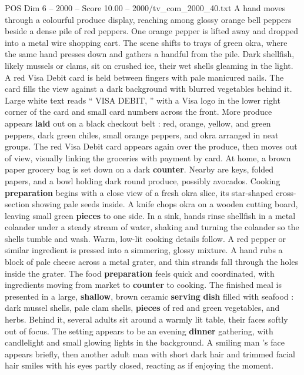 \begin{textsample}{POS Dim 6 – 2000 – Score 10.00 – 2000/tv\_com\_2000\_40.txt}  \label{ex:f6_pos_052}
A hand moves through a colourful produce display, reaching among glossy orange bell peppers beside a dense pile of red peppers.
One orange pepper is lifted away and dropped into a metal wire shopping cart.
The scene shifts to trays of green okra, where the same hand presses down and gathers a handful from the pile.
Dark shellfish, likely mussels or clams, sit on crushed ice, their wet shells gleaming in the light.
A red Visa Debit card is held between fingers with pale manicured nails.
The card fills the view against a dark background with blurred vegetables behind it.
Large white text reads “ VISA DEBIT, ” with a Visa logo in the lower right corner of the card and small card numbers across the front.
More produce appears \textbf{laid} out on a black checkout belt : red, orange, yellow, and green peppers, dark green chiles, small orange peppers, and okra arranged in neat groups.
The red Visa Debit card appears again over the produce, then moves out of view, visually linking the groceries with payment by card.
At home, a brown paper grocery bag is set down on a dark \textbf{counter}.
Nearby are keys, folded papers, and a bowl holding dark round produce, possibly avocados.
Cooking \textbf{preparation} begins with a close view of a fresh okra slice, its star-shaped cross-section showing pale seeds inside.
A knife chops okra on a wooden cutting board, leaving small green \textbf{pieces} to one side.
In a sink, hands rinse shellfish in a metal colander under a steady stream of water, shaking and turning the colander so the shells tumble and wash.
Warm, low-lit cooking details follow.
A red pepper or similar ingredient is pressed into a simmering, glossy mixture.
A hand rubs a block of pale cheese across a metal grater, and thin strands fall through the holes inside the grater.
The food \textbf{preparation} feels quick and coordinated, with ingredients moving from market to \textbf{counter} to cooking.
The finished meal is presented in a large, \textbf{shallow}, brown ceramic \textbf{serving} \textbf{dish} filled with seafood : dark mussel shells, pale clam shells, \textbf{pieces} of red and green vegetables, and herbs.
Behind it, several adults sit around a warmly lit table, their faces softly out of focus.
The setting appears to be an evening \textbf{dinner} gathering, with candlelight and small glowing lights in the background.
A smiling man ’s face appears briefly, then another adult man with short dark hair and trimmed facial hair smiles with his eyes partly closed, reacting as if enjoying the moment.

\end{textsample}
